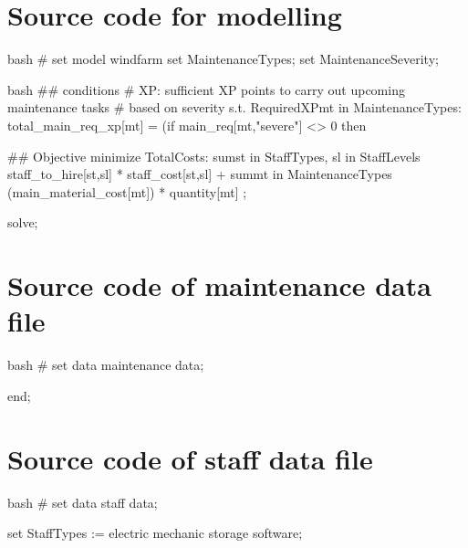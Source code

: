 \section{Source code for modelling}
    \vspace{2pt}
    \begin{boxminted}{bash}
        # set model windfarm
        set MaintenanceTypes;
        set MaintenanceSeverity;
    \end{boxminted}
    \newpage
    \vspace{2pt}
    \begin{boxminted}{bash}
        ## conditions
        # XP: sufficient XP points to carry out upcoming maintenance tasks 
        # based on severity
        s.t. RequiredXP{mt in MaintenanceTypes}: 
            total_main_req_xp[mt] = (if main_req[mt,"severe"] <> 0 then 
        
        ## Objective
        minimize TotalCosts: 
            sum{st in StaffTypes, sl in StaffLevels} staff_to_hire[st,sl] * 
                staff_cost[st,sl] +
            sum{mt in MaintenanceTypes} (main_material_cost[mt]) * 
                quantity[mt] ;
        
        solve;
        
    \end{boxminted}
    \newpage

\section{Source code of maintenance data file}
    \vspace{2pt}
    \begin{boxminted}{bash}
        # set data maintenance
        data;

        end;         
    \end{boxminted}
    \newpage

\section{Source code of staff data file}
    \vspace{2pt}
    \begin{boxminted}{bash}
        # set data staff
        data;
        
        set StaffTypes :=
            electric
            mechanic
            storage
            software;
        
    \end{boxminted}
    \newpage
